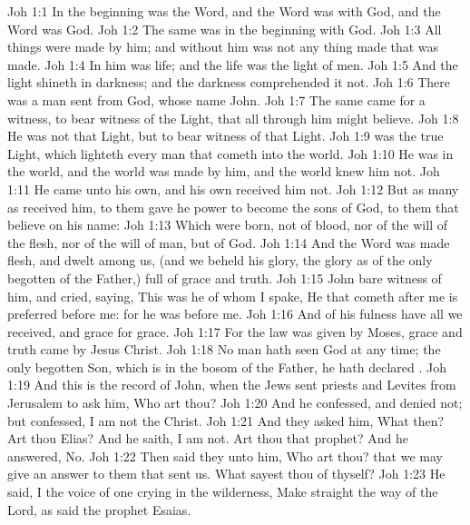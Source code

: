 \vs Joh 1:1 In the beginning was the Word, and the Word was with God, and the Word was God.
\vs Joh 1:2 The same was in the beginning with God.
\vs Joh 1:3 All things were made by him; and without him was not any thing made that was made.
\vs Joh 1:4 In him was life; and the life was the light of men.
\vs Joh 1:5 And the light shineth in darkness; and the darkness comprehended it not.
\vs Joh 1:6 There was a man sent from God, whose name  John.
\vs Joh 1:7 The same came for a witness, to bear witness of the Light, that all  through him might believe.
\vs Joh 1:8 He was not that Light, but  to bear witness of that Light.
\vs Joh 1:9  was the true Light, which lighteth every man that cometh into the world.
\vs Joh 1:10 He was in the world, and the world was made by him, and the world knew him not.
\vs Joh 1:11 He came unto his own, and his own received him not.
\vs Joh 1:12 But as many as received him, to them gave he power to become the sons of God,  to them that believe on his name:
\vs Joh 1:13 Which were born, not of blood, nor of the will of the flesh, nor of the will of man, but of God.
\vs Joh 1:14 And the Word was made flesh, and dwelt among us, (and we beheld his glory, the glory as of the only begotten of the Father,) full of grace and truth.
\vs Joh 1:15 John bare witness of him, and cried, saying, This was he of whom I spake, He that cometh after me is preferred before me: for he was before me.
\vs Joh 1:16 And of his fulness have all we received, and grace for grace.
\vs Joh 1:17 For the law was given by Moses,  grace and truth came by Jesus Christ.
\vs Joh 1:18 No man hath seen God at any time; the only begotten Son, which is in the bosom of the Father, he hath declared .
\vs Joh 1:19 And this is the record of John, when the Jews sent priests and Levites from Jerusalem to ask him, Who art thou?
\vs Joh 1:20 And he confessed, and denied not; but confessed, I am not the Christ.
\vs Joh 1:21 And they asked him, What then? Art thou Elias? And he saith, I am not. Art thou that prophet? And he answered, No.
\vs Joh 1:22 Then said they unto him, Who art thou? that we may give an answer to them that sent us. What sayest thou of thyself?
\vs Joh 1:23 He said, I  the voice of one crying in the wilderness, Make straight the way of the Lord, as said the prophet Esaias.

